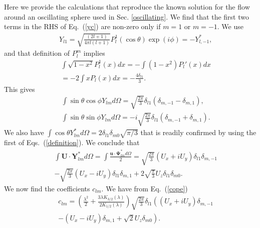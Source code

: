 \documentclass[aps,prx,twocolumn,amsmath,amssymb,amsfonts]{revtex4-2}
\begin{document}
{{\begin{appendices}
Here we provide the calculations that reproduce the known solution for the flow around an oscillating sphere used in Sec. \ref{oscillating}. We find that the first two terms in the RHS of Eq.~(\ref{yc}) are non-zero only if $m=1$ or $m=-1$. We use
\begin{eqnarray}&&
Y_{l1}=\sqrt{\frac{(2l+1)}{4\pi l(l+1)}}P_l^1(\cos\theta)\exp\left(i\phi\right)=-Y_{l,-1}^*,\label{sd}%
\end{eqnarray}
and that definition of $P_l^m$ implies
\begin{eqnarray}&&
\int  \sqrt{1-x^2} P_l^1(x) dx=-\int (1-x^2) P_l'(x) dx
\nonumber\\&&
=-2\int x P_l(x) dx=-\frac{4\delta_{l1}}{3}.
\end{eqnarray}
This gives
\begin{eqnarray}&&
\int \sin\theta\cos\phi Y_{lm} d\Omega=\sqrt{\frac{2\pi}{3}} \delta_{l1}(\delta_{m, -1}-\delta_{m, 1}),
\nonumber\\&&
\int \sin\theta\sin\phi Y_{lm} d\Omega=-  i\sqrt{\frac{2\pi}{3}} \delta_{l1}(\delta_{m, -1}+\delta_{m, 1}).
\end{eqnarray}
We also have $\int \cos\theta Y_{lm}^* d\Omega\!=\!2\delta_{l1}\delta_{m0} \sqrt{\pi/3}$ that is readily confirmed by using the first of Eqs.~(\ref{definition}). We conclude that
\begin{eqnarray}&&\!\!\!\!\!\!\!\!
\int\! \bm U\!\cdot\! \bm Y_{lm}^* d\Omega\!=\!\int\! \frac{\bm u\!\cdot \!\bm \Psi_{lm}^* d\Omega}{2}\!=\!\sqrt{\frac{2\pi}{3}} \left(U_x\!+\!iU_y\right)\delta_{l1}\delta_{m, -1}
\nonumber\\&&
- \sqrt{\frac{2\pi}{3}}(U_x-i U_y) \delta_{l1}\delta_{m, 1}+ 2\sqrt{\frac{\pi}{3}}U_z\delta_{l1}\delta_{m0}. \label{cp}
\end{eqnarray}
We now find the coefficients $c_{lm}$. We have from Eq.~(\ref{cope})
\begin{eqnarray}&&
c_{lm}\!=\!\left(\frac{\lambda^2}{2}+\frac{3\lambda K_{3/2}(\lambda)}{2K_{1/2}(\lambda)}\right)\sqrt{\frac{2\pi}{3}}\delta_{l1} \left(\left(U_x+iU_y\right)\delta_{m, -1}
\right.\nonumber\\&&\left.
-(U_x-i U_y) \delta_{m, 1}+ \sqrt{2}U_z\delta_{m0}\right).
\end{eqnarray}

\end{appendices}}}
\end{document}
